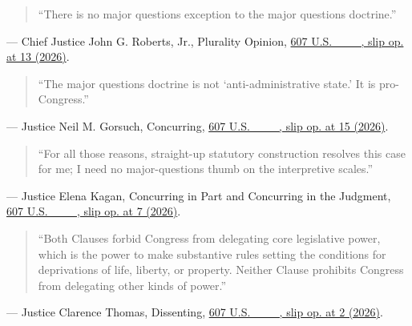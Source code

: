 \documentclass[12pt]{article}
\begin{document}
\begin{quote}
``There is no major questions exception to the major questions doctrine.''
\end{quote}
\noindent --- Chief Justice John G. Roberts, Jr., Plurality Opinion, \href{https://www.law.cornell.edu/supremecourt/text/24-1287}{607 U.S. \_\_\_, slip op. at 13 (2026)}.

\begin{quote}
``The major questions doctrine is not `anti-administrative state.' It is pro-Congress.''
\end{quote}
\noindent --- Justice Neil M. Gorsuch, Concurring, \href{https://www.law.cornell.edu/supremecourt/text/24-1287}{607 U.S. \_\_\_, slip op. at 15 (2026)}.

\begin{quote}
``For all those reasons, straight-up statutory construction resolves this case for me; I need no major-questions thumb on the interpretive scales.''
\end{quote}
\noindent --- Justice Elena Kagan, Concurring in Part and Concurring in the Judgment, \href{https://www.law.cornell.edu/supremecourt/text/24-1287}{607 U.S. \_\_\_, slip op. at 7 (2026)}.

\begin{quote}
``Both Clauses forbid Congress from delegating core legislative power, which is the power to make substantive rules setting the conditions for deprivations of life, liberty, or property. Neither Clause prohibits Congress from delegating other kinds of power.''
\end{quote}
\noindent --- Justice Clarence Thomas, Dissenting, \href{https://www.law.cornell.edu/supremecourt/text/24-1287}{607 U.S. \_\_\_, slip op. at 2 (2026)}.
\end{document}
